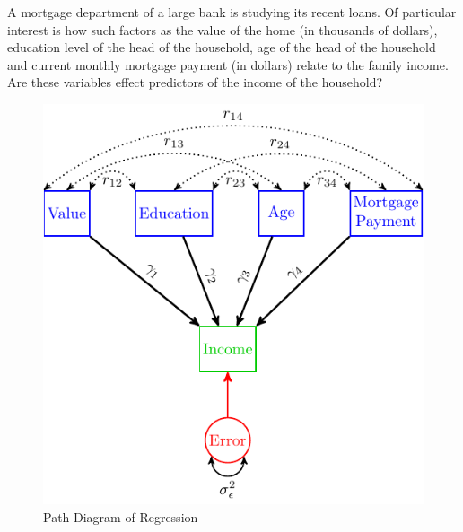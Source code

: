 \begin{example}
A mortgage department of a large bank is studying its recent loans. Of particular interest is how such factors as the value of the home (in thousands of dollars), education level of the head of the household, age of the head of the household and current monthly mortgage payment (in dollars) relate to the family income. Are these variables effect predictors of the income of the household?
\end{example}


\begin{figure}[H]

{\centering \includegraphics[width=0.8\linewidth]{images/Reg2} 

}

\caption{Path Diagram of Regression}\label{fig:Reg2}
\end{figure}

